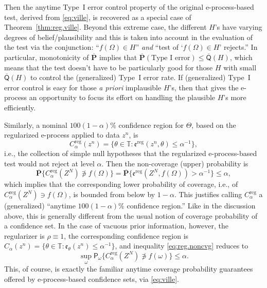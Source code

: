 \documentclass[a4paper, 12pt]{article}
\theoremstyle{plain}
\theoremstyle{definition}
\theoremstyle{remark}
\newcommand{\prob}{\mathsf{P}}
\newcommand{\TT}{\mathbb{T}}
\newcommand{\uprior}{\overline{\mathsf{Q}}}
\newcommand{\uuprob}{\mathbf{\overline{P}}}
\newcommand{\eval}{\mathfrak{e}}
\begin{document}
Then the anytime Type~I error control property of the original e-process-based test, derived from \eqref{eq:ville}, is recovered as a special case of Theorem~\ref{thm:reg.ville}.  
Beyond this extreme case, the different $H$'s have varying degrees of belief/plausibility and this is taken into account in the evaluation of the test via the conjunction: ``$f(\Omega) \in H$'' {\em and} ``test of `$f(\Omega) \in H$' rejects.'' In particular, monotonicity of $\uuprob$ implies that $\uuprob(\text{Type~I error}) \leq \uprior(H)$, which means that the test doesn't have to be particularly good for those $H$ with small $\uprior(H)$ to control the (generalized) Type~I error rate.  If (generalized) Type~I error control is easy for those {\em a priori} implausible $H$'s, then that gives the e-process an opportunity to focus its effort on handling the plausible $H$'s more efficiently.  

Similarly, a nominal $100(1-\alpha)$\% confidence region for $\Theta$, based on the regularized e-process applied to data $z^n$, is 
\[ C_\alpha^\text{reg}(z^n) = \bigl\{ \theta \in \TT: \eval^\text{reg}(z^n, \theta) \leq \alpha^{-1} \bigr\}, \]
i.e., the collection of simple null hypotheses that the regularized e-process-based test would not reject at level $\alpha$.  Then the non-coverage (upper) probability is 
\begin{equation}
\label{eq:reg.noncvg}
\uuprob\{ C_\alpha^\text{reg}(Z^N) \not\ni f(\Omega) \} = \uuprob\{ \eval^\text{reg}(Z^N, f(\Omega)) > \alpha^{-1} \} \leq \alpha, 
\end{equation}
which implies that the corresponding lower probability of coverage, i.e., of $C_\alpha^\text{reg}(Z^N) \ni f(\Omega)$, is bounded from below by $1-\alpha$.  This justifies calling $C_\alpha^\text{reg}$ a (generalized) ``anytime $100(1-\alpha)$\% confidence region.'' Like in the discussion above, this is generally different from the usual notion of coverage probability of a confidence set.  In the case of vacuous prior information, however, the regularizer is $\rho \equiv 1$, the corresponding confidence region is $C_\alpha(z^n) = \{ \theta \in \TT: \eval_\theta(z^n) \leq \alpha^{-1} \}$, and inequality  \eqref{eq:reg.noncvg} reduces to 
\[ \sup_\omega \prob_\omega\{ C_\alpha^\text{reg}(Z^N) \not\ni f(\omega) \} \leq \alpha. \]
This, of course, is exactly the familiar anytime coverage probability guarantees offered by e-process-based confidence sets, via \eqref{eq:ville}.  
\end{document}
